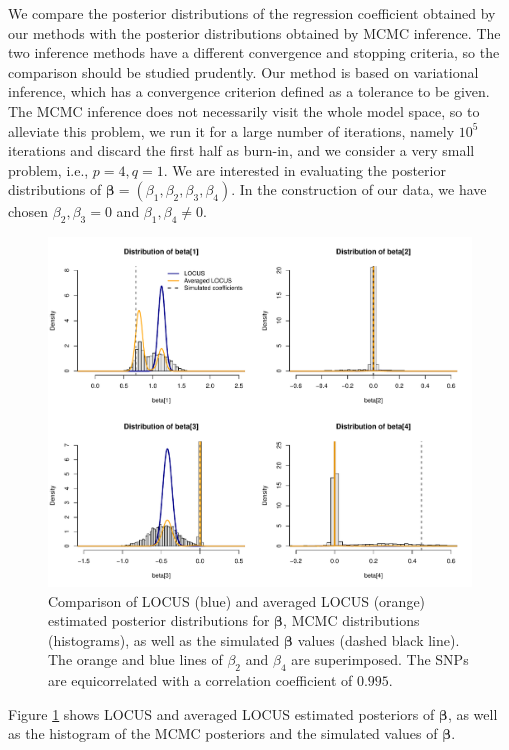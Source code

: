 \documentclass[a4paper, 11pt]{report}
\numberwithin{equation}{chapter}
\begin{document}
We compare the posterior distributions of the regression coefficient obtained by our methods with the posterior distributions obtained by MCMC inference. The two inference methods have a different convergence and stopping criteria, so the comparison should be studied prudently. Our method is based on variational inference, which has a convergence criterion defined as a tolerance to be given. The MCMC inference does not necessarily visit the whole model space, so to alleviate this problem, we run it for a large number of iterations, namely $10^5$ iterations and discard the first half as burn-in, and we consider a very small problem, i.e., $p=4, q=1$. We are interested in evaluating the posterior distributions of $\boldsymbol{\beta} = (\beta_1, \beta_2, \beta_3, \beta_4)$. In the construction of our data, we have chosen $\beta_2, \beta_3 = 0$ and $\beta_1, \beta_4 \neq 0$.
\begin{figure}[h]
\centering
\includegraphics[width=\textwidth, bb=0 0 9.8in 8.07in]{images/MCMC_noanneal.pdf}
\caption{\label{fig:no_ann}Comparison of LOCUS (blue) and averaged LOCUS (orange) estimated posterior distributions for $\boldsymbol{\beta}$, MCMC distributions (histograms), as well as the simulated $\boldsymbol{\beta}$ values (dashed black line). The orange and blue lines of $\beta_2$ and $\beta_4$ are superimposed. The SNPs are equicorrelated with a correlation coefficient of $0.995$.}
\end{figure}

Figure \ref{fig:no_ann} shows LOCUS and averaged LOCUS estimated posteriors of $\boldsymbol{\beta}$, as well as the histogram of the MCMC posteriors and the simulated values of $\boldsymbol{\beta}$. 
\end{document}

